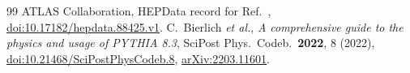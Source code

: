 \documentclass[11pt,a4paper]{article}
\begin{document}
\begin{thebibliography}{99}
 ATLAS Collaboration, HEPData record for Ref.~\cite{ATLAS:2019erb}, \href{https://doi.org/10.17182/hepdata.88425.v1}{doi:10.17182/hepdata.88425.v1}.
 C.~Bierlich \emph{et al.}, \emph{A comprehensive guide to the physics and usage of PYTHIA 8.3}, SciPost Phys.\ Codeb.\ \textbf{2022}, 8 (2022), \href{https://doi.org/10.21468/SciPostPhysCodeb.8}{doi:10.21468/SciPostPhysCodeb.8}, \href{https://arxiv.org/abs/2203.11601}{arXiv:2203.11601}.
\end{thebibliography}
\end{document}
